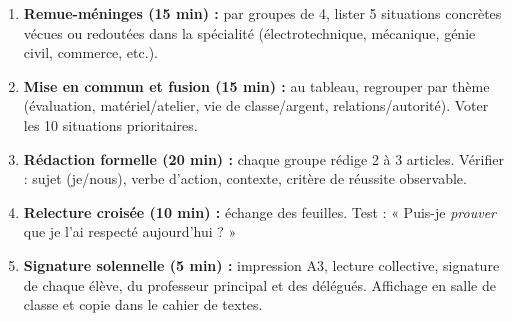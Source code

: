 \documentclass[11pt]{article}
\begin{document}
\begin{methode}
\begin{enumerate}
    \item \textbf{Remue-méninges (15 min) :} par groupes de 4, lister 5 situations concrètes vécues ou redoutées dans la spécialité (électrotechnique, mécanique, génie civil, commerce, etc.).
    \item \textbf{Mise en commun et fusion (15 min) :} au tableau, regrouper par thème (évaluation, matériel/atelier, vie de classe/argent, relations/autorité). Voter les 10 situations prioritaires.
    \item \textbf{Rédaction formelle (20 min) :} chaque groupe rédige 2 à 3 articles. Vérifier : sujet (je/nous), verbe d'action, contexte, critère de réussite observable.
    \item \textbf{Relecture croisée (10 min) :} échange des feuilles. Test : « Puis-je \emph{prouver} que je l'ai respecté aujourd'hui ? »
    \item \textbf{Signature solennelle (5 min) :} impression A3, lecture collective, signature de chaque élève, du professeur principal et des délégués. Affichage en salle de classe et copie dans le cahier de textes.
\end{enumerate}
\end{methode}
\end{document}
